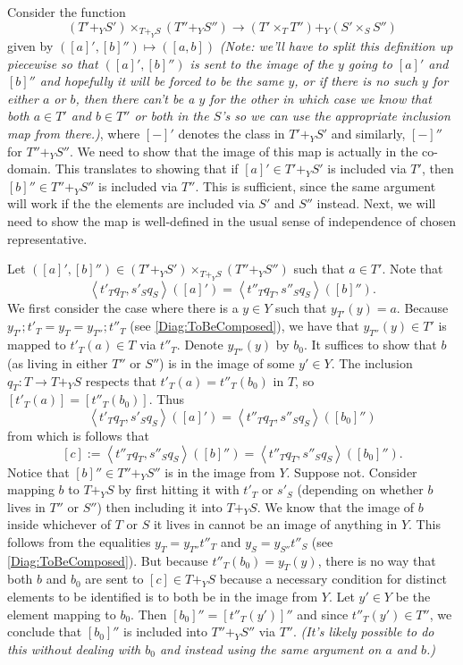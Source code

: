 \documentclass[12pt]{article}
\newcommand{\from}{\colon}
\renewcommand{\(}{\left(}
\renewcommand{\)}{\right)}
\renewcommand{\{}{\left\lbrace}
\renewcommand{\}}{\right\rbrace}
\theoremstyle{remark}
\theoremstyle{definition}
\begin{document}
Consider the function 
\[
	(T' +_Y S') \times_{T +_Y S} (T'' +_Y S'') \to (T' \times_T T'') +_Y (S' \times_S S'')
\]
given by $([a]',[b]'') \mapsto ([a,b])$ \textit{(Note: we'll have to split this definition up piecewise so that $([a]',[b]'')$ is sent to the image of the $y$ going to $[a]'$ and $[b]''$ and hopefully it will be forced to be the same $y$, or if there is no such $y$ for either $a$ or $b$, then there can't be a $y$ for the other in which case we know that both $a \in T'$ and $b \in T''$ or both in the $S$'s so we can use the appropriate inclusion map from there.)}, where $[-]'$ denotes the class in $T'+_YS'$ and similarly, $[-]''$ for $T''+_YS''$.  We need to show that the image of this map is actually in the co-domain.  This translates to showing that if $[a]' \in T' +_Y S'$ is included via $T'$, then $[b]'' \in T'' +_Y S''$ is included via $T''$.  This is sufficient, since the same argument will work if the the elements are included via $S'$ and $S''$ instead.  Next, we will need to show the map is well-defined in the usual sense of independence of chosen representative.  

Let $([a]',[b]'') \in (T' +_Y S') \times_{T +_Y S} (T'' +_Y S'')$ such that $a \in T'$.  Note that
\[
	\left\langle t'_Tq_T,s'_Sq_S \right\rangle ([a]') 
		= \left\langle t''_Tq_T,s''_Sq_S \right\rangle ([b]'').
\]  
We first consider the case where there is a $y \in Y$ such that $y_{T'}(y)=a$.  Because $y_{T'};t'_{T}=y_T=y_{T''};t''_T$  (see \eqref{Diag:ToBeComposed}), we have that $y_{T''}(y) \in T'$ is mapped to $t'_T(a) \in T$ via $t''_{T}$. Denote $y_{T''}(y)$ by $b_0$. It suffices to show that $b$ (as living in either $T''$ or $S''$) is in the image of some $y' \in Y$.  The inclusion $q_T \from T \to T+_YS$ respects that $t'_T(a)=t''_T(b_0)$ in $T$, so $[t'_T (a)] = [t''_T (b_0)]$. Thus
\[
	\left\langle t'_Tq_T,s'_Sq_S \right\rangle ([a]') 
	= \left\langle t''_Tq_T,s''_Sq_S \right\rangle ([b_0]'')
\]
from which is follows that
\[
	[c] 
		:=\left\langle t''_Tq_T,s''_Sq_S \right\rangle ([b]'')
		= \left\langle t''_Tq_T,s''_Sq_S \right\rangle ([b_0]'').
\]
Notice that $[b]'' \in T'' +_Y S''$ is in the image from $Y$.  Suppose not. Consider mapping $b$ to $T +_Y S$ by first hitting it with $t'_T$ or $s'_S$ (depending on whether $b$ lives in $T''$ or $S''$) then including it into $T +_Y S$. We know that the image of $b$ inside whichever of $T$ or $S$ it lives in cannot be an image of anything in $Y$.  This follows from the equalities $y_T = y_{T''}t''_T$ and $y_S = y_{S''}t''_S$ (see \eqref{Diag:ToBeComposed}).  But because $t''_T(b_0)=y_T(y)$, there is no way that both $b$ and $b_0$ are sent to $[c] \in T +_Y S$ because a necessary condition for distinct elements to be identified is to both be in the image from $Y$.  Let $y' \in Y$ be the element mapping to $b_0$.  Then $[b_0]''=[t''_{T}(y')]''$ and since $t''_{T}(y') \in T''$, we conclude that $[b_0]''$ is included into $T'' +_Y S''$ via $T''$.  \textit{(It's likely possible to do this without dealing with $b_0$ and instead using the same argument on $a$ and $b$.)}
\end{document}
